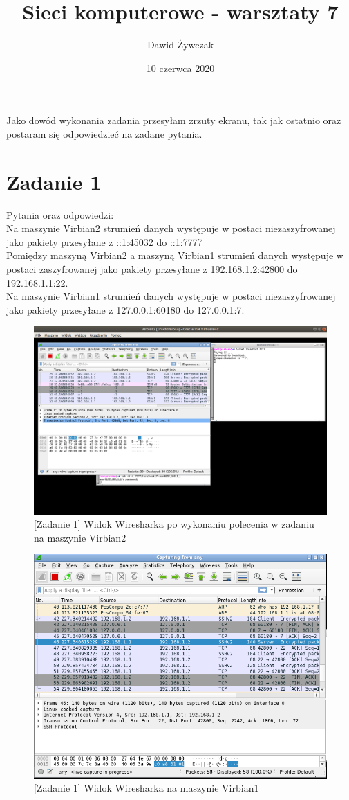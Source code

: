 \documentclass[a4paper]{scrartcl}
\title{Sieci komputerowe - warsztaty 7}
\author{Dawid Żywczak}
\date{10 czerwca 2020}
\begin{document}
\maketitle
\qquad Jako dowód wykonania zadania przesyłam zrzuty ekranu, tak jak ostatnio oraz postaram się odpowiedzieć na zadane pytania.\\
\section{Zadanie 1}
Pytania oraz odpowiedzi:\\
Na maszynie Virbian2 strumień danych występuje w postaci niezaszyfrowanej jako pakiety przesyłane z ::1:45032 do ::1:7777\\
Pomiędzy maszyną Virbian2 a maszyną Virbian1 strumień danych występuje w postaci zaszyfrowanej jako pakiety przesyłane z 192.168.1.2:42800 do 192.168.1.1:22.\\
Na maszynie Virbian1 strumień danych występuje w postaci niezaszyfrowanej jako pakiety przesyłane z 127.0.0.1:60180 do 127.0.0.1:7.
\begin{figure}
  \includegraphics[width=\linewidth]{zad1.png}
  \caption{[Zadanie 1] Widok Wiresharka po wykonaniu polecenia w zadaniu na maszynie Virbian2}
\end{figure}
\begin{figure}
  \includegraphics[width=\linewidth]{wireshark_v1.png}
  \caption{[Zadanie 1] Widok Wiresharka na maszynie Virbian1}
\end{figure}
\end{document}
